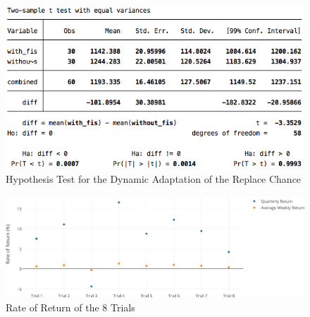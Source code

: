 \documentclass[a4paper,twoside]{article}
\begin{document}
%
\begin{figure}[h!]
\begin{center}
\includegraphics[width=1.00\columnwidth]{figures/dynamic-parameter-statistical-test/dynamic-parameter-statistical-test}
\caption{{\label{dynamic-hypothesis-test}Hypothesis Test for the Dynamic Adaptation of the Replace Chance%
}}
\end{center}
\end{figure}

\begin{figure}[h!]
\begin{center}
\includegraphics[width=1.00\columnwidth]{figures/percent-return-per-trial/percent-return-per-trial}
\caption{{\label{8-trials}Rate of Return of the 8 Trials%
}}
\end{center}
\end{figure}
\end{document}
